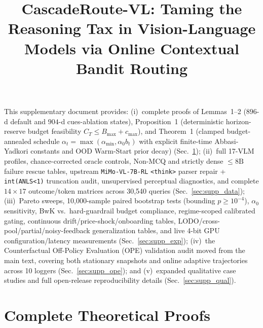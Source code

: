 \documentclass[10pt,twocolumn,letterpaper]{article}
\title{CascadeRoute-VL: Taming the Reasoning Tax in Vision-Language Models via Online Contextual Bandit Routing}
\begin{document}
\maketitlesupplementary
\setcounter{section}{0}
\renewcommand{\thesection}{S\arabic{section}}
\renewcommand{\thetable}{S\arabic{table}}
\renewcommand{\thefigure}{S\arabic{figure}}

This supplementary document provides:
(i)~complete proofs of Lemmas~1--2 ($896$-d default and $904$-d cues-ablation states), Proposition~1 (deterministic horizon-reserve budget feasibility $C_T \le B_{\max} + c_{\max}$), and Theorem~1 (clamped budget-annealed schedule $\alpha_t{=}\max(\alpha_{\min}, \alpha_0 b_t)$ with explicit finite-time Abbasi-Yadkori constants and OOD Warm-Start prior decay) (Sec.~\ref{sec:supp_proofs});
(ii)~full 17-VLM profiles, chance-corrected oracle controls, Non-MCQ and strictly dense $\le 8\text{B}$ failure rescue tables, upstream \texttt{MiMo-VL-7B-RL} \texttt{<think>} parser repair + \texttt{int(ANLS<1)} truncation audit, unsupervised perceptual diagnostics, and complete $14\times 17$ outcome/token matrices across 30,540 queries (Sec.~\ref{sec:supp_data});
(iii)~Pareto sweeps, 10,000-sample paired bootstrap tests (bounding $p \ge 10^{-4}$), $\alpha_0$ sensitivity, BwK vs.\ hard-guardrail budget compliance, regime-scoped calibrated gating, continuous drift/price-shock/onboarding tables, LODO/cross-pool/partial/noisy-feedback generalization tables, and live 4-bit GPU configuration/latency measurements (Sec.~\ref{sec:supp_exp});
(iv)~the Counterfactual Off-Policy Evaluation (OPE) validation audit moved from the main text, covering both stationary snapshots and online adaptive trajectories across 10 loggers (Sec.~\ref{sec:supp_ope}); and
(v)~expanded qualitative case studies and full open-release reproducibility details (Sec.~\ref{sec:supp_qual}).

\section{Complete Theoretical Proofs}
\label{sec:supp_proofs}
\end{document}
